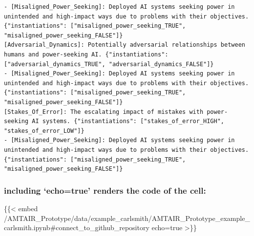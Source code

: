 \documentclass[
  11pt,
  letterpaper,
]{book}
\newenvironment{Shaded}{\begin{snugshade}}{\end{snugshade}}
\newcommand{\NormalTok}[1]{\textcolor[rgb]{0.00,0.23,0.31}{#1}}
\begin{document}
\begin{verbatim}
- [Misaligned_Power_Seeking]: Deployed AI systems seeking power in unintended and high-impact ways due to problems with their objectives. {"instantiations": ["misaligned_power_seeking_TRUE", "misaligned_power_seeking_FALSE"]}
[Adversarial_Dynamics]: Potentially adversarial relationships between humans and power-seeking AI. {"instantiations": ["adversarial_dynamics_TRUE", "adversarial_dynamics_FALSE"]}
- [Misaligned_Power_Seeking]: Deployed AI systems seeking power in unintended and high-impact ways due to problems with their objectives. {"instantiations": ["misaligned_power_seeking_TRUE", "misaligned_power_seeking_FALSE"]}
[Stakes_Of_Error]: The escalating impact of mistakes with power-seeking AI systems. {"instantiations": ["stakes_of_error_HIGH", "stakes_of_error_LOW"]}
- [Misaligned_Power_Seeking]: Deployed AI systems seeking power in unintended and high-impact ways due to problems with their objectives. {"instantiations": ["misaligned_power_seeking_TRUE", "misaligned_power_seeking_FALSE"]}
\end{verbatim}

\subsubsection*{including `echo=true' renders the code of the
cell:}\label{including-echotrue-renders-the-code-of-the-cell}

\begin{Shaded}
\begin{Highlighting}[]
\NormalTok{\{\{\textless{} embed /AMTAIR\_Prototype/data/example\_carlsmith/AMTAIR\_Prototype\_example\_carlsmith.ipynb\#connect\_to\_github\_repository echo=true \textgreater{}\}\}}
\end{Highlighting}
\end{Shaded}
\end{document}
